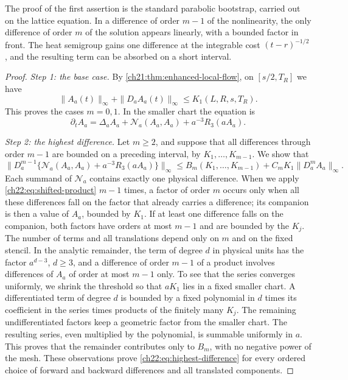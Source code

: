 The proof of the first assertion is the standard parabolic bootstrap, carried out on the lattice equation. In a difference of order $m-1$ of the nonlinearity, the only difference of order $m$ of the solution appears linearly, with a bounded factor in front. The heat semigroup gains one difference at the integrable cost $(t-r)^{-1/2}$, and the resulting term can be absorbed on a short interval.

\begin{proof}
\emph{Step 1: the base case.} By \cref{ch21:thm:enhanced-local-flow}, on $[s/2,T_R]$ we have
\begin{equation}\label{ch22:eq:bootstrap-base}
 \|A_a(t)\|_\infty+\|D_aA_a(t)\|_\infty\le K_1(L,R,s,T_R).
\end{equation}
This proves the cases $m=0,1$. In the smaller chart the equation is
\begin{equation}\label{ch22:eq:bootstrap-equation}
 \partial_tA_a=\Delta_aA_a+\mathcal N_a(A_a,A_a)+a^{-3}R_3(aA_a).
\end{equation}

\emph{Step 2: the highest difference.} Let $m\ge2$, and suppose that all differences through order $m-1$ are bounded on a preceding interval, by $K_1,\ldots,K_{m-1}$. We show that
\begin{equation}\label{ch22:eq:highest-difference}
 \bigl\|D_a^{m-1}\bigl\{\mathcal N_a(A_a,A_a)+a^{-3}R_3(aA_a)\bigr\}\bigr\|_\infty\le B_m(K_1,\ldots,K_{m-1})+C_mK_1\|D_a^mA_a\|_\infty .
\end{equation}
Each summand of $\mathcal N_a$ contains exactly one physical difference. When we apply \eqref{ch22:eq:shifted-product} $m-1$ times, a factor of order $m$ occurs only when all these differences fall on the factor that already carries a difference; its companion is then a value of $A_a$, bounded by $K_1$. If at least one difference falls on the companion, both factors have orders at most $m-1$ and are bounded by the $K_j$. The number of terms and all translations depend only on $m$ and on the fixed stencil. In the analytic remainder, the term of degree $d$ in physical units has the factor $a^{d-3}$, $d\ge3$, and a difference of order $m-1$ of a product involves differences of $A_a$ of order at most $m-1$ only. To see that the series converges uniformly, we shrink the threshold so that $aK_1$ lies in a fixed smaller chart. A differentiated term of degree $d$ is bounded by a fixed polynomial in $d$ times its coefficient in the series times products of the finitely many $K_j$. The remaining undifferentiated factors keep a geometric factor from the smaller chart. The resulting series, even multiplied by the polynomial, is summable uniformly in $a$. This proves that the remainder contributes only to $B_m$, with no negative power of the mesh. These observations prove \eqref{ch22:eq:highest-difference} for every ordered choice of forward and backward differences and all translated components.


\end{proof}
